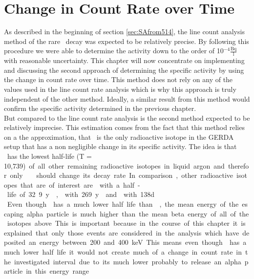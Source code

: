 \documentclass[encoding=utf8,british]{tumphthesis}
\begin{document}

\chapter{Change in Count Rate over Time}
\label{sec:SAfromDecrease}

As described in the beginning of section \ref{sec:SAfrom514}, the line count analysis method of the rare \Kr\ decay was expected to be relatively precise.
By following this procedure we were able to determine the activity down to the order of 10$^{-4} \frac{\mathrm{Bq}}{\mathrm{l}}$ with reasonable uncertainty.
This chapter will now concentrate on implementing and discussing the second approach of determining the specific activity by using the change in count rate over time.
This method does not rely on any of the values used in the line count rate analysis which is why this approach is truly independent of the other method.
Ideally, a similar result from this method would confirm the specific activity determined in the previous chapter. 
\\

But compared to the line count rate analysis is the second method  expected to be relatively imprecise.  
This estimation comes from the fact that this method relies on a the approximation, that \Kr\ is the only radioactive isotope in the GERDA setup that has a non negligible change in its specific activity.
The idea is that \Kr\ has the lowest half-life (T = 10,739\unit) of all other remaining radioactive isotopes in liquid argon and therefor only \Kr\ should change its decay rate.
In comparison, other radioactive isotopes that are of interest are  with a half-life of 32.9 y \cite{chen_nuclear_2016},  with 269 y \cite{singh_nuclear_2006} and  with 138d \cite{kondev_nuclear_2008}.
\\

Even though has a much lower half life than \Kr, the mean energy of the escaping alpha particle is much higher than the mean beta energy of all of the isotopes above.
This is important because in the course of this chapter it is explained that only those events are considered in the analysis which have deposited an energy between 200 and 400 keV. 
This means even though  has a much lower half life it would not create much of a change in count rate in the investigated interval due to its much lower probably to release an alpha particle in this energy range.
\\
\end{document}
